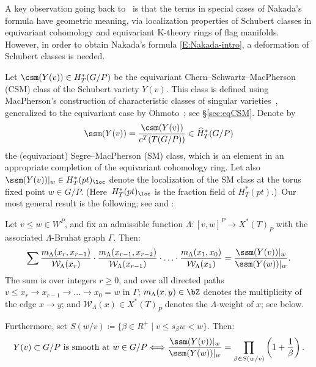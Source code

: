 A key observation going back to~\cite{mihalcea:eqqhom,naruse2014schubert,naruse2019skew} 
	is that the terms in special cases of Nakada's formula have geometric meaning, via
	localization properties of Schubert classes in equivariant cohomology
	and equivariant K-theory rings of flag manifolds. However, in order to obtain
	Nakada's formula \eqref{E:Nakada-intro}, a deformation of Schubert classes is needed.

Let $\csm(Y(v)) \in H^*_T(G/P)$ be the equivariant
Chern--Schwartz--MacPherson (CSM) class of the Schubert variety $Y(v)$. This class is defined using MacPherson's 
construction of characteristic classes of singular varieties~\cite{macpherson:chern}, generalized to the equivariant case by 
Ohmoto~\cite{ohmoto:eqcsm}; see \S\ref{sec:eqCSM}. Denote by 
\[ \ssm(Y(v)) = \frac{\csm(Y(v))}{c^T(T(G/P))} \in \widehat{H}^*_T(G/P) \]
the (equivariant) Segre--MacPherson (SM) class, which is an element in an 
appropriate completion of the equivariant cohomology ring. Let also 
$\ssm(Y(v))|_w \in H^*_T(pt)_{\loc}$ denote the localization of the SM class at the torus fixed point
$w \in G/P$. {(Here~$H^*_T(pt)_{\loc}$ is the fraction field of $H^*_T(pt)$.)}~Our 
most general result is the following; see  and : 
	\begin{theorem}\label{thm:intro-main-rev}
		Let $v\leq  w\in W^P$, and fix an admissible 
		function $\Lambda:[v,w]^P\to X^{*}(T)_P$ with the associated 
		$\Lambda$-Bruhat graph $\Gamma$. Then: 
		\begin{equation}\label{intro:SMfrac} \sum\frac{m_\Lambda(x_r,x_{r-1})}{\mathcal{W}_\Lambda(x_r)}\cdot \frac{m_\Lambda(x_{r-1},x_{r-2})}{\mathcal{W}_\Lambda(x_{r-1})}\cdot \ldots \cdot \frac{m_\Lambda(x_{1},x_{0})}{\mathcal{W}_\Lambda(x_{1})}
			= 
			\frac{\ssm(Y(v))|_w}{\ssm(Y(w))|_w}\/. \end{equation}
		The sum is over integers $r \ge 0$, and over all directed paths 
		$v\leq x_r \overset{}{\to} x_{r-1} \overset{}{\to} \ldots \overset{}{\to} x_0 = w$ in $\Gamma$;
		$m_\Lambda(x,y) \in \bZ$ denotes the multiplicity of the edge $x \to y$; and $\mathcal{W}_\Lambda(x)
		\in X^{*}(T)_P$
		denotes the $\Lambda$-weight of $x$; see  below. 
		
		Furthermore, set $S(w/v)\coloneqq \{\beta\in R^+\mid v\le s_\beta w<w\}$. Then:
		\[ \textrm{$Y(v)\subset G/P$ is smooth at $w\in G/P$} \Longleftrightarrow \frac{\ssm(Y(v))|_w}{\ssm(Y(w))|_w} = \prod_{\beta \in S(w/v)} \left(1+\frac{1}{\beta}\right) \/.\]
	\end{theorem}
